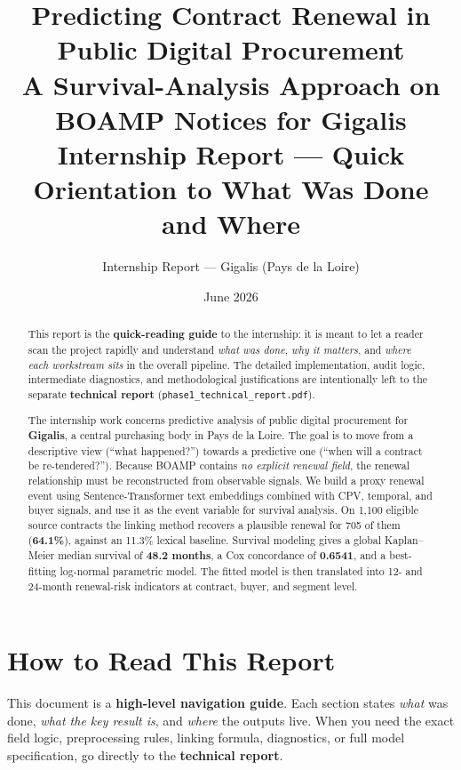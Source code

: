 \documentclass[11pt,a4paper]{article}
\title{\textbf{Predicting Contract Renewal in Public Digital Procurement}\\[0.4em]
      \large A Survival-Analysis Approach on BOAMP Notices for Gigalis\\[0.3em]
      \normalsize Internship Report --- Quick Orientation to What Was Done and Where}
\author{Internship Report --- Gigalis (Pays de la Loire)}
\date{June 2026}
\begin{document}
\maketitle
\thispagestyle{fancy}

\begin{abstract}
\noindent
This report is the \textbf{quick-reading guide} to the internship: it is meant
to let a reader scan the project rapidly and understand \emph{what was done},
\emph{why it matters}, and \emph{where each workstream sits} in the overall
pipeline. The detailed implementation, audit logic, intermediate diagnostics,
and methodological justifications are intentionally left to the separate
\textbf{technical report} (\texttt{phase1\_technical\_report.pdf}).

The internship work concerns predictive analysis of public digital procurement
for \textbf{Gigalis}, a central purchasing body in Pays de la Loire. The goal
is to move from a descriptive view (``what happened?'') towards a predictive one
(``when will a contract be re-tendered?''). Because BOAMP contains
\emph{no explicit renewal field}, the renewal relationship must be reconstructed
from observable signals. We build a proxy renewal event using
Sentence-Transformer text embeddings combined with CPV, temporal, and buyer
signals, and use it as the event variable for survival analysis. On
1{,}100 eligible source contracts the linking method recovers a plausible renewal
for 705 of them (\textbf{64.1\%}), against an 11.3\% lexical baseline. Survival
modeling gives a global Kaplan--Meier median survival of \textbf{48.2 months},
a Cox concordance of \textbf{0.6541}, and a best-fitting log-normal parametric
model. The fitted model is then translated into 12- and 24-month renewal-risk
indicators at contract, buyer, and segment level.
\end{abstract}

\section{How to Read This Report}

This document is a \textbf{high-level navigation guide}. Each section states
\emph{what} was done, \emph{what the key result is}, and \emph{where} the
outputs live. When you need the exact field logic, preprocessing rules, linking
formula, diagnostics, or full model specification, go directly to the
\textbf{technical report}.
\end{document}
